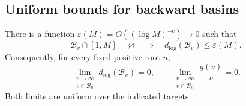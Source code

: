 \subsection{Uniform bounds for backward basins}

\begin{proposition}\label{prop:ct-basin-boundary}
There is a function \(\varepsilon(M)=O((\log M)^{-c})\to0\)
such that
\begin{equation}\label{eq:ct-small-ancestor}
 \mathcal B_v\cap[1,M]=\varnothing
       \quad\Longrightarrow\quad
 d_{\log}(\mathcal B_v)\le\varepsilon(M).
\end{equation}
Consequently, for every fixed positive root \(n\),
\begin{equation}\label{eq:ct-fixed-basin-boundary}
 \lim_{\substack{v\to\infty\\v\in\mathcal B_n}}
 d_{\log}(\mathcal B_v)=0,\qquad
 \lim_{\substack{v\to\infty\\v\in\mathcal B_n}}\frac{g(v)}v=0.
\end{equation}
Both limits are uniform over the indicated targets.
\end{proposition}
